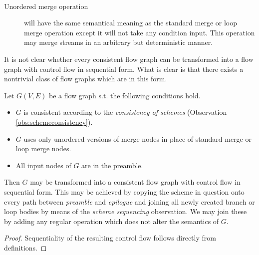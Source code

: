  \ 
\begin{description}
  \item [Unordered merge operation] will have the same semantical meaning as the standard merge or loop merge operation except it will not take any condition input. This operation may merge streams in an arbitrary but deterministic manner.
\end{description}
\myenddef

It is not clear whether every consistent flow graph can be transformed into a flow graph with control flow in sequential form. What is clear is that there exists a nontrivial class of flow graphs which are in this form.

  Let $G(V,E)$ be a flow graph s.t. the following conditions hold.
  \begin{itemize}
    \item $G$ is consistent according to the \emph{consistency of schemes} (Observation \ref{obs:schemeconsistency}).
    \item $G$ uses only unordered versions of merge nodes in place of standard merge or loop merge nodes.
    \item All input nodes of $G$ are in the preamble.
  \end {itemize} 
  Then $G$ may be transformed into a consistent flow graph with control flow in sequential form. This may be achieved by copying the scheme in question onto every path between \emph{preamble} and \emph{epilogue} and joining all newly created branch or loop bodies by means of the \emph{scheme sequencing} observation. We may join these by adding any regular operation which does not alter the semantics of $G$.
  \begin{proof} 
  Sequentiality of the resulting control flow follows directly from definitions.
  \end{proof}
\myendobs

